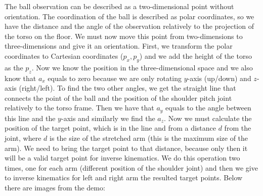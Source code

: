 The ball observation can be described as a two-dimensional point without orientation. The coordination of the ball is described as polar coordinates, so we have the distance and the angle of the observation relatively to the projection of the torso on the floor. We must now move this point from two-dimensions to three-dimensions and give it an orientation. First, we transform the polar coordinates to Cartesian coordinates ($ p_x,p_y $) and we add the height of the torso as the \(p_z\). Now we know the position in the three-dimensional space and we also know that \(a_x\) equals to zero because we are only rotating \(y\)-axis (up/down) and \(z\)-axis (right/left). To find the two other angles, we get the straight line that connects the point of the ball and the position of the shoulder pitch joint relatively to the torso frame. Then we have that \(a_y\) equals to the angle between this line and the \(y\)-axis and similarly we find the \(a_z\). Now we must calculate the position of the target point, which is in the line and from a distance \(d\) from the joint, where \(d\) is the size of the stretched arm (this is the maximum size of the arm). We need to bring the target point to that distance, because only then it will be a valid target point for inverse kinematics. We do this operation two times, one for each arm (different position of the shoulder joint) and then we give to inverse kinematics for left and right arm the resulted target points. Below there are images from the demo:
